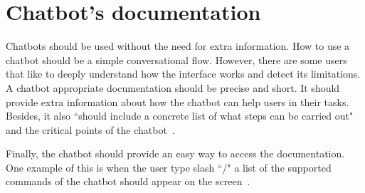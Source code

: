 \documentclass[a4paper,10pt]{article}
\begin{document}
\section{Chatbot's documentation}

Chatbots should be used without the need for extra information. How to use a chatbot should be a simple conversational flow. However, there are some users that like to deeply understand how the interface works and detect its limitations. A chatbot appropriate documentation should be precise and short. It should provide extra information about how the chatbot can help users in their tasks. Besides, it also ``should include a concrete list of what steps can be carried out" and the critical points of the chatbot~\cite{HeuristicsWebPage}. 

Finally, the chatbot should provide an easy way to access the documentation. One example of this is when the user type slash ``/" a list of the supported commands of the chatbot should appear on the screen~\cite{botfather}.  


\medskip


\end{document}
